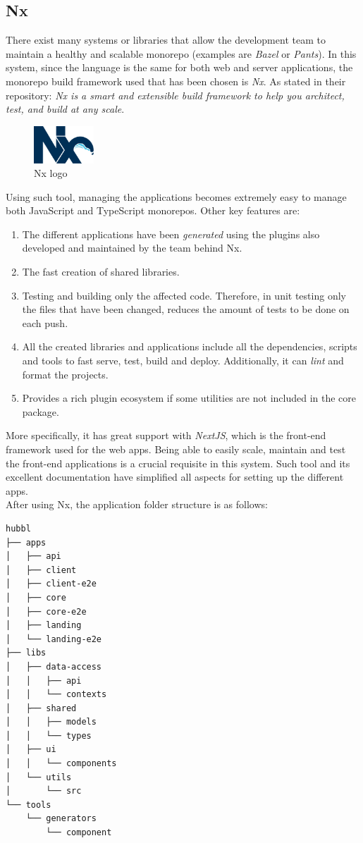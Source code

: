 \documentclass[a4paper, 12pt, oneside]{book}
\begin{document}
\subsection{Nx}
There exist many systems or libraries that allow the development team to maintain a healthy and scalable monorepo (examples are \emph{Bazel} or \emph{Pants}). In this system, since the language is the same for both web and server applications, the monorepo build framework used that has been chosen is \emph{Nx}. As stated in their repository: \emph{Nx is a smart and extensible build framework to help you architect, test, and build at any scale}.
\begin{figure}[H]
	\centering
	\includegraphics[width=0.2\textwidth]{assets/nx-logo.png}
	\caption{Nx logo}
\end{figure}
Using such tool, managing the applications becomes extremely easy to manage both JavaScript and TypeScript monorepos. Other key features are:
\begin{enumerate}[label = -]
	\item The different applications have been \emph{generated} using the plugins also developed and maintained by the team behind Nx.
	\item The fast creation of shared libraries.
	\item Testing and building only the affected code. Therefore, in unit testing only the files that have been changed, reduces the amount of tests to be done on each push.
	\item All the created libraries and applications include all the dependencies, scripts and tools to fast serve, test, build and deploy. Additionally, it can \emph{lint} and format the projects.
	\item Provides a rich plugin ecosystem if some utilities are not included in the core package.
\end{enumerate}
More specifically, it has great support with \emph{NextJS}, which is the front-end framework used for the web apps. Being able to easily scale, maintain and test the front-end applications is a crucial requisite in this system. Such tool and its excellent documentation have simplified all aspects for setting up the different apps.
\\[8pt]
After using Nx, the application folder structure is as follows:
\begin{verbatim}
hubbl
├── apps
│   ├── api
│   ├── client
│   ├── client-e2e
│   ├── core
│   ├── core-e2e
│   ├── landing
│   └── landing-e2e
├── libs
│   ├── data-access
│   │   ├── api
│   │   └── contexts
│   ├── shared
│   │   ├── models
│   │   └── types
│   ├── ui
│   │   └── components
│   └── utils
│       └── src
└── tools
    └── generators
        └── component
\end{verbatim}
\end{document}
